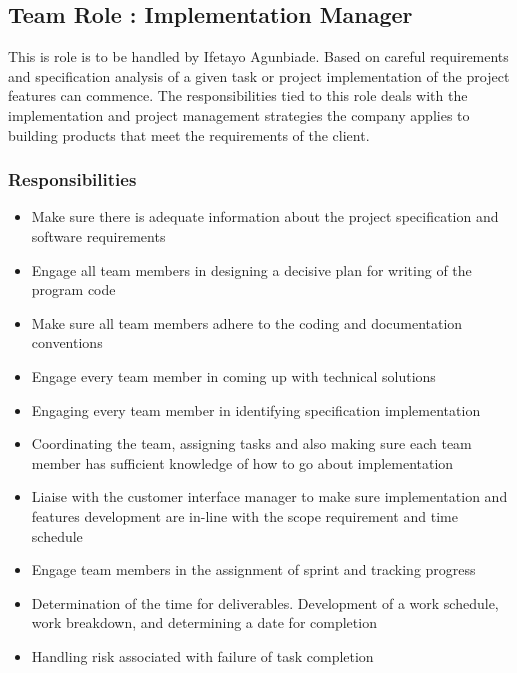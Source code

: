\documentclass{article}
\begin{document}
\subsection{Team Role : Implementation Manager}
This is role is to be handled by Ifetayo Agunbiade. Based on careful requirements and specification analysis of a given task or project implementation of the project features can commence. The responsibilities tied to this role deals with the implementation and project management strategies the company applies to building products that meet the requirements of the client. 
\subsubsection{Responsibilities}
\begin{itemize}
\item
Make sure there is adequate information about the project specification and software requirements
\item
Engage all team members in designing a decisive plan for writing of the program code
\item
Make sure all team members adhere to the coding and documentation conventions \cite{bobs3cs}
\item
Engage every team member in coming up with technical solutions
\item
Engaging every team member in identifying specification implementation
\item
Coordinating the team, assigning tasks and also making sure each team member has sufficient knowledge of how to go about implementation
\item
Liaise with the customer interface manager to make sure implementation and features development are in-line with the scope requirement and time schedule
\item
Engage team members in the assignment of sprint and tracking progress
\item
Determination of the time for deliverables. Development of a work schedule, work breakdown, and determining a date for completion
\item
Handling risk associated with failure of task completion
\end{itemize}
\end{document}
